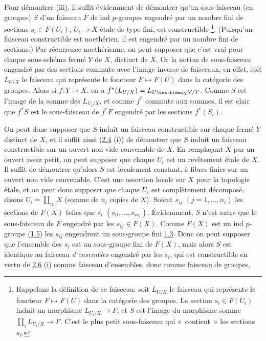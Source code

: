 \documentclass[10pt]{../fichiers-configuration-latex/smfart}
\begin{document}
Pour démontrer (iii), il suffit évidemment de démontrer qu'un
sous-faisceau (en groupes) $S$ d'un faisceau $F$ de ind $p$-groupes
engendré par un nombre fini de sections $s_i\in F(U_i)$,
$U_i\rightarrow X$ étale de type fini, est constructible
\footnote[1]{Rappelons la définition de ce faisceau: soit $L_{U/X}$
le faisceau qui représente le foncteur $F\mapsto F(U)$ dans la
catégorie des groupes. La section $s_i\in F(U_i)$ induit un morphisme
$L_{U_i/X}\rightarrow F$, et $S$ est l'image du morphisme somme
$\amalg_i L_{U_i/X}\rightarrow F$. C'est le plus petit sous-faisceau
qui « contient » les sections $s_i$.}. (Puisqu'un\pageoriginale
faisceau constructible est noethérien, il est engendré par un nombre
fini de sections.) Par récurrence noethérienne, on peut supposer que
c'est vrai pour chaque sous-schéma fermé $Y$ de $X$, distinct de
$X$. Or la notion de sous-faisceau engendré par des sections commute
avec l'image inverse de faisceaux; en effet, soit $L_{U/X}$ le
faisceau qui représente le foncteur $F\mapsto F(U)$ dans la catégorie
des groupes. Alors si $f:Y\rightarrow X$, on a
$f^{\ast}(L_{U/X})=L_{\fprod{U}{Y}{X}/Y}$. Comme $S$ est l'image de la
somme des $L_{U_i/X}$, et comme $f^{\ast}$ commute aux sommes, il est
clair que $f^{\ast}S$ est le sous-faisceau de $f^{\ast}F$ engendré par
les sections $f^{\ast}(S_i)$.

On peut donc supposer que $S$ induit un faisceau constructible sur
chaque fermé $Y$ distinct de $X$, et il suffit ainsi (\hyperref[IX.prop2.4]{2.4} (i)) de
démontrer que $S$ induit un faisceau constructible sur un ouvert
non-vide convenable de $X$. En remplaçant $X$ par un ouvert assez
petit, on peut supposer que chaque $U_i$ est un revêtement étale de
$X$. Il suffit de démontrer qu'alors $S$ est localement constant, à
fibres finies sur un ouvert non vide convenable. C'est une assertion
locale sur $X$ pour la topologie étale, et on peut donc supposer que
chaque $U_i$ est complètement décomposé, disons $U_i=\amalg_{n_i}X$
(somme de $n_i$ copies de $X$). Soient $s_{ij}$ $(j=1,\ldots,n_i)$ les
sections de $F(X)$ telles que
$s_i$ $(s_{il},\ldots,s_{in_i})$. Évidemment, $S$ n'est autre que le
sous-faisceau de $F$ engendré par les $s_{ij}\in F(X)$. Comme $F(X)$
est un ind $p$-groupe (\hyperref[IX.def1.5]{1.5}) les $s_{ij}$ engendrent un sous-groupe
fini \hyperref[IX.def1.3]{1.3}. Donc on peut supposer que l'ensemble des $s_i$ est un
sous-groupe fini de $F(X)$, mais alors $S$ est identique au faisceau
\emph{d'ensembles} engendré par les $s_i$, qui est constructible en
vertu de \hyperref[IX.prop2.6]{2.6} (i) comme faisceau d'ensembles, donc comme faisceau de
groupes, \cqfd
\end{document}
